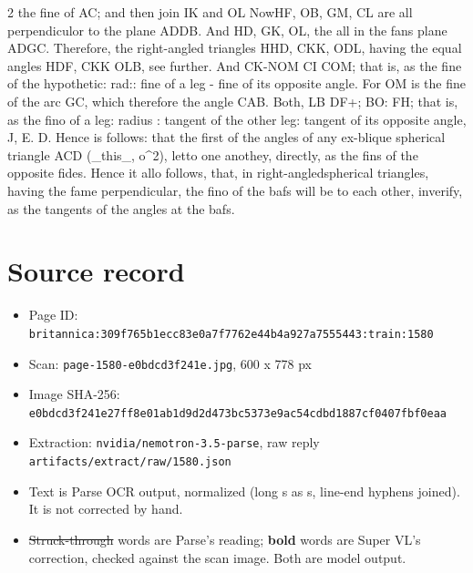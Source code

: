 \documentclass[10pt]{article}
\begin{document}
\begin{multicols}{2}
the fine of AC; and then join IK and OL NowHF, OB, GM, CL are all perpendiculor to the plane ADDB. And HD, GK, OL, the all in the fans plane ADGC. Therefore, the right-angled triangles HHD, CKK, ODL, having the equal angles HDF, CKK OLB, see further. And CK-NOM CI COM; that is, as the fine of the hypothetic: rad:: fine of a leg - fine of its opposite angle. For OM is the fine of the arc GC, which therefore the angle CAB. Both, LB DF+; BO: FH; that is, as the fino of a leg: radius : tangent of the other leg: tangent of its opposite angle, J, E. D. Hence is follows: that the first of the angles of any ex-blique spherical triangle ACD (\_this\_, o\textasciicircum{}2), letto one anothey, directly, as the fins of the opposite fides. Hence it allo follows, that, in right-angledspherical triangles, having the fame perpendicular, the fino of the bafs will be to each other, inverify, as the tangents of the angles at the bafs.
\end{multicols}
\section*{Source record}
\begin{itemize}
\item Page ID: \texttt{britannica:309f765b1ecc83e0a7f7762e44b4a927a7555443:train:1580}
\item Scan: \texttt{page-1580-e0bdcd3f241e.jpg}, 600 x 778 px
\item Image SHA-256: \texttt{\small e0bdcd3f241e27ff8e01ab1d9d2d473bc5373e9ac54cdbd1887cf0407fbf0eaa}
\item Extraction: \texttt{nvidia/nemotron-3.5-parse}, raw reply \texttt{artifacts/extract/raw/1580.json}
\item Text is Parse OCR output, normalized (long s as s, line-end hyphens joined). It is not corrected by hand.
\item \sout{Struck-through} words are Parse's reading; \textbf{bold} words are Super VL's correction, checked against the scan image. Both are model output.
\end{itemize}
\end{document}
